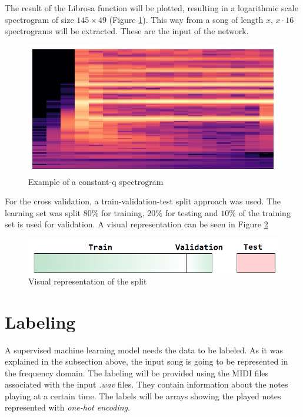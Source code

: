 The result of the Librosa function will be plotted, resulting in a logarithmic scale spectrogram of size $145\times49$ (Figure \ref{fig:q_spec}). This way from a song of length $x$, $x \cdot 16$ spectrograms will be extracted. These are the input of the network.  
	
\begin{figure}[H]
	\caption[Example of a constant-q spectrogram]{ Example of a constant-q spectrogram }
	\centering
	\label{fig:q_spec}
	\includegraphics[width=1\textwidth, height=\textheight, keepaspectratio]{"resources/q_spec"}
\end{figure}

\par

For the cross validation, a train-validation-test split approach was used. The learning set was split $80\%$ for training, $20\%$ for testing and $10\%$ of the training set is used for validation. A visual representation can be seen in Figure \ref{fig:split}


\begin{figure}[H]
	\caption[Visual representation of the split]{ Visual representation of the split}
	\centering
	\label{fig:split}
	\includegraphics[width=1\textwidth, height=\textheight, keepaspectratio]{"resources/train_split"}
\end{figure}


\section{Labeling}
A supervised machine learning model needs the data to be labeled. As it was explained in the subsection above, the input song is going to be represented in the frequency domain. The labeling will be provided using the MIDI files associated with the input \textit{.wav} files. They contain information about the notes playing at a certain time. The labels will be arrays showing the played notes represented with \textit{one-hot encoding}.
\par

